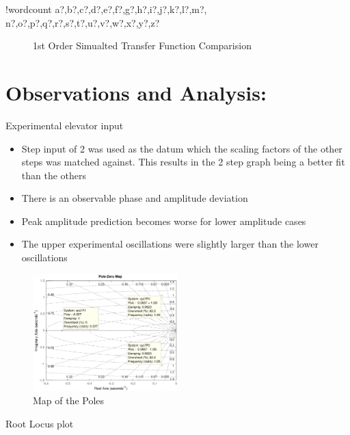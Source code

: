 \documentclass[11pt]{article}
\providecommand{\tightlist}{%
  \setlength{\itemsep}{0pt}\setlength{\parskip}{0pt}}
\newcounter{words}
\newenvironment{counted}{%
  \setcounter{words}{0}
  \SearchList!{wordcount}{\stepcounter{words}}
    {a?,b?,c?,d?,e?,f?,g?,h?,i?,j?,k?,l?,m?,
    n?,o?,p?,q?,r?,s?,t?,u?,v?,w?,x?,y?,z?}
  \UndoBoundary{'}
  \SearchOrder{p;}}{%
  \StopSearching}
\begin{document}
\begin{counted}
\begin{figure}[H]
\begin{minipage}{.49\textwidth}
  \caption{1st Order Simualted Transfer Function Comparision}
  \label{1stTFcomp}
\end{minipage}
\end{figure}

\section{Observations and Analysis:}\label{observations-and-analysis}

Experimental elevator input

\begin{itemize}
\tightlist
\item
  Step input of 2 was used as the datum which the scaling factors of the
  other steps was matched against. This results in the 2 step graph
  being a better fit than the others
\item
  There is an observable phase and amplitude deviation
\item
  Peak amplitude prediction becomes worse for lower amplitude cases
\item
  The upper experimental oscillations were slightly larger than the
  lower oscillations
\end{itemize}

\begin{figure}
  \begin{center}
  \vspace{0pt}
  \includegraphics[trim = 35 14 35 0, clip, width=0.5\textwidth]{poleszmap.eps}
  \end{center}
  \caption{Map of the Poles}
 \label{poleszmap}
  \vspace{-25pt}
\end{figure}

Root Locus plot


\end{counted}
\end{document}
